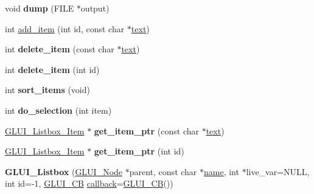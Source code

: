 \begin{DoxyCompactItemize}
\item 
\hypertarget{classGLUI__Listbox_a25d2492d85e1faec1f2e5f9feab8bf7c}{void {\bfseries dump} (F\-I\-L\-E $\ast$output)}\label{classGLUI__Listbox_a25d2492d85e1faec1f2e5f9feab8bf7c}

\item 
int \hyperlink{classGLUI__Listbox_a173e91d0db2dc5af267e79a592c2af13}{add\-\_\-item} (int id, const char $\ast$\hyperlink{classGLUI__Control_af0d60e9736f4dbc34e9a536e75876d72}{text})
\item 
\hypertarget{classGLUI__Listbox_abd8fc9a22c95fc21835f97b98d8c8ca6}{int {\bfseries delete\-\_\-item} (const char $\ast$\hyperlink{classGLUI__Control_af0d60e9736f4dbc34e9a536e75876d72}{text})}\label{classGLUI__Listbox_abd8fc9a22c95fc21835f97b98d8c8ca6}

\item 
\hypertarget{classGLUI__Listbox_a814c6749c88cb55a8fca87958d149a19}{int {\bfseries delete\-\_\-item} (int id)}\label{classGLUI__Listbox_a814c6749c88cb55a8fca87958d149a19}

\item 
\hypertarget{classGLUI__Listbox_a54993d7fc093becfddb63b9ebd48def5}{int {\bfseries sort\-\_\-items} (void)}\label{classGLUI__Listbox_a54993d7fc093becfddb63b9ebd48def5}

\item 
\hypertarget{classGLUI__Listbox_afc762e2a72b14bd536cc836f28c53f25}{int {\bfseries do\-\_\-selection} (int item)}\label{classGLUI__Listbox_afc762e2a72b14bd536cc836f28c53f25}

\item 
\hypertarget{classGLUI__Listbox_a12428a6ca8ce1018c2b191e0eee774ce}{\hyperlink{classGLUI__Listbox__Item}{G\-L\-U\-I\-\_\-\-Listbox\-\_\-\-Item} $\ast$ {\bfseries get\-\_\-item\-\_\-ptr} (const char $\ast$\hyperlink{classGLUI__Control_af0d60e9736f4dbc34e9a536e75876d72}{text})}\label{classGLUI__Listbox_a12428a6ca8ce1018c2b191e0eee774ce}

\item 
\hypertarget{classGLUI__Listbox_affa1e8cb4df6d4e2c4d1242a6af8e6be}{\hyperlink{classGLUI__Listbox__Item}{G\-L\-U\-I\-\_\-\-Listbox\-\_\-\-Item} $\ast$ {\bfseries get\-\_\-item\-\_\-ptr} (int id)}\label{classGLUI__Listbox_affa1e8cb4df6d4e2c4d1242a6af8e6be}

\item 
\hypertarget{classGLUI__Listbox_a04f341fb0ac378ae1fc09c18f88a393c}{{\bfseries G\-L\-U\-I\-\_\-\-Listbox} (\hyperlink{classGLUI__Node}{G\-L\-U\-I\-\_\-\-Node} $\ast$parent, const char $\ast$\hyperlink{classGLUI__Control_aa95b97d50df45335fc33f0af03958eb3}{name}, int $\ast$live\-\_\-var=N\-U\-L\-L, int id=-\/1, \hyperlink{classGLUI__CB}{G\-L\-U\-I\-\_\-\-C\-B} \hyperlink{classGLUI__Control_a96060fe0cc6d537e736dd6eef78e24ab}{callback}=\hyperlink{classGLUI__CB}{G\-L\-U\-I\-\_\-\-C\-B}())}\label{classGLUI__Listbox_a04f341fb0ac378ae1fc09c18f88a393c}

\end{DoxyCompactItemize}
